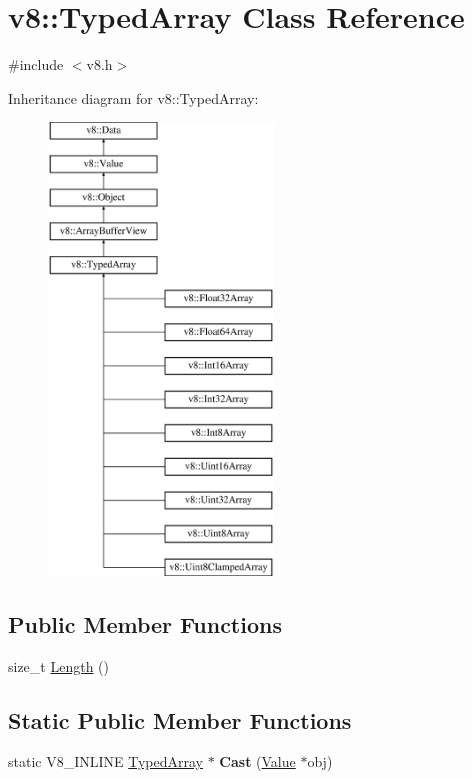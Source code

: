 \hypertarget{classv8_1_1_typed_array}{}\section{v8\+:\+:Typed\+Array Class Reference}
\label{classv8_1_1_typed_array}


{\ttfamily \#include $<$v8.\+h$>$}

Inheritance diagram for v8\+:\+:Typed\+Array\+:\begin{figure}[H]
\begin{center}
\leavevmode
\includegraphics[height=12.000000cm]{classv8_1_1_typed_array}
\end{center}
\end{figure}
\subsection*{Public Member Functions}
\begin{DoxyCompactItemize}
\item 
size\+\_\+t \hyperlink{classv8_1_1_typed_array_abb1047225d53d960c0da9c9f83cd7042}{Length} ()
\end{DoxyCompactItemize}
\subsection*{Static Public Member Functions}
\begin{DoxyCompactItemize}
\item 
static V8\+\_\+\+I\+N\+L\+I\+NE \hyperlink{classv8_1_1_typed_array}{Typed\+Array} $\ast$ {\bfseries Cast} (\hyperlink{classv8_1_1_value}{Value} $\ast$obj)\hypertarget{classv8_1_1_typed_array_ac3f23cc8171d3be0815df7731140382f}{}\label{classv8_1_1_typed_array_ac3f23cc8171d3be0815df7731140382f}

\end{DoxyCompactItemize}
